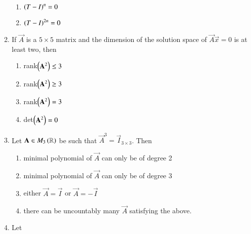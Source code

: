 \begin{enumerate}[label=\thesection.\arabic*.,ref=\thesection.\theenumi]
\begin{enumerate}
\item $\left(T-I\right)^{n} = 0$ 
\item $\left(T-I\right)^{2n} = 0$ 
\end{enumerate}
%
\item If $\vec{A}$ is a $5\times 5$ matrix and the dimension of the solution space of $\vec{A}\vec{x} = 0$ is at least two, then
\begin{enumerate}
\item rank$\left(\mathbf{A}^2\right) \le 3$ 
\item rank$\left(\mathbf{A}^2\right) \ge 3$ 
\item rank$\left(\mathbf{A}^2\right) = 3$ 
\item det$\left(\mathbf{A}^2\right) = 0$ 
\end{enumerate}
%
\item Let $\mathbf{A} \in M_3\left(\mathbb{R}\right)$ be such that $\vec{A}^3 = \vec{I}_{3\times 3}$.  Then
\begin{enumerate}
\item minimal polynomial of $\vec{A}$ can only be of degree 2
\item minimal polynomial of $\vec{A}$ can only be of degree 3
\item either $\vec{A} = \vec{I}$ or $\vec{A} = -\vec{I}$
\item there can be uncountably many $\vec{A}$ satisfying the above.
\end{enumerate}
%
\item Let 
\end{enumerate}

